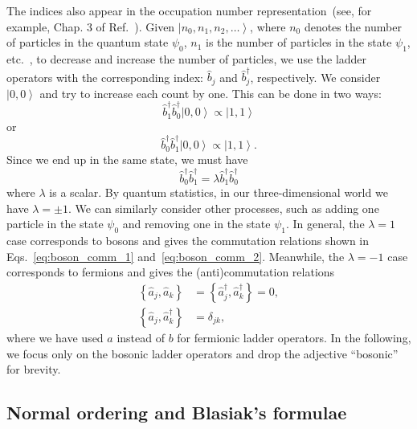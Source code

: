 \documentclass[onecolumn, 12pt, sort&compress]{elsarticle}
\newcommand{\ket}[1]{\left|{#1}\right\rangle}
\newcommand{\acomm}[2]{\left\{{#1},{#2}\right\}}
\newcommand{\bop}{\hat{b}}
\newcommand{\bdag}{\bop^\dagger}
\begin{document}
The indices also appear in the occupation number representation~(see, for example, Chap. 3 of Ref.~\cite{lancaster_quantum_2014}). Given $\ket{n_0,n_1,n_2,\dots}$, where $n_0$ denotes the number of particles in the quantum state $\psi_0$, $n_1$ is the number of particles in the state $\psi_1$, etc.~\cite{lancaster_quantum_2014}, to decrease and increase the number of particles, we use the ladder operators with the corresponding index: $\bop_j$ and $\bdag_j$, respectively.  We consider $\ket{0,0}$ and try to increase each count by one.  This can be done in two ways:
\begin{equation}
    \bdag_1\bdag_0\ket{0,0}\propto\ket{1,1}
\end{equation}
or
\begin{equation}
    \bdag_0\bdag_1\ket{0,0}\propto\ket{1,1}.
\end{equation}
Since we end up in the same state, we must have
\begin{equation}
    \bdag_0\bdag_1=\lambda\bdag_1\bdag_0
\end{equation}
where $\lambda$ is a scalar.  By quantum statistics, in our three-dimensional world we have $\lambda=\pm 1$.  We can similarly consider other processes, such as adding one particle in the state $\psi_0$ and removing one in the state $\psi_1$.  In general, the $\lambda=1$ case corresponds to bosons and gives the commutation relations shown in Eqs.~\eqref{eq:boson_comm_1} and~\eqref{eq:boson_comm_2}.  Meanwhile, the $\lambda=-1$ case corresponds to fermions and gives the (anti)commutation relations
\begin{subequations}
\begin{align}
    \acomm{\hat{a}_j}{\hat{a}_k} &= \acomm{\hat{a}_j^\dagger}{\hat{a}_k^\dagger} = 0,
    \\
    \acomm{\hat{a}_j}{\hat{a}_k^\dagger} &= \delta_{jk},
\end{align}
\end{subequations}
where we have used $a$ instead of $b$ for fermionic ladder operators. 
 In the following, we focus only on the bosonic ladder operators and drop the adjective ``bosonic'' for brevity. 


\subsection{Normal ordering and Blasiak's formulae}\label{subsec:normal_ordering}
\end{document}
